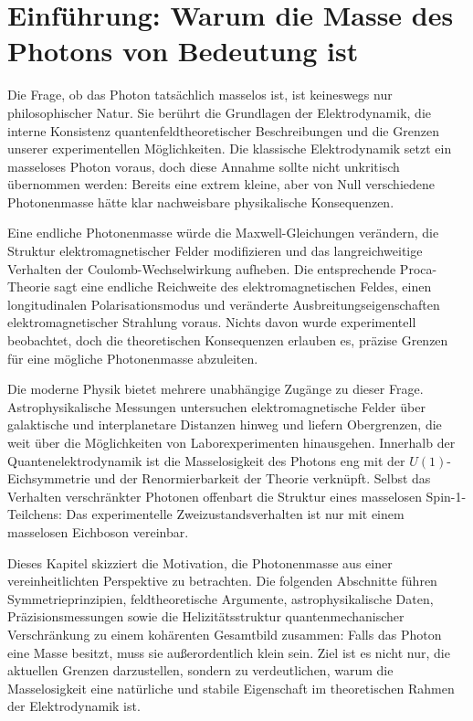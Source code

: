 \section{Einführung: Warum die Masse des Photons von Bedeutung ist}

Die Frage, ob das Photon tatsächlich masselos ist, ist keineswegs nur 
philosophischer Natur. Sie berührt die Grundlagen der Elektrodynamik, 
die interne Konsistenz quantenfeldtheoretischer Beschreibungen und die 
Grenzen unserer experimentellen Möglichkeiten. Die klassische 
Elektrodynamik setzt ein masseloses Photon voraus, doch diese Annahme 
sollte nicht unkritisch übernommen werden: Bereits eine extrem kleine, 
aber von Null verschiedene Photonenmasse hätte klar nachweisbare 
physikalische Konsequenzen.

Eine endliche Photonenmasse würde die Maxwell-Gleichungen verändern, die 
Struktur elektromagnetischer Felder modifizieren und das langreichweitige 
Verhalten der Coulomb-Wechselwirkung aufheben. Die entsprechende Proca-Theorie 
sagt eine endliche Reichweite des elektromagnetischen Feldes, einen 
longitudinalen Polarisationsmodus und veränderte Ausbreitungseigenschaften 
elektromagnetischer Strahlung voraus. Nichts davon wurde experimentell 
beobachtet, doch die theoretischen Konsequenzen erlauben es, präzise 
Grenzen für eine mögliche Photonenmasse abzuleiten.

Die moderne Physik bietet mehrere unabhängige Zugänge zu dieser Frage. 
Astrophysikalische Messungen untersuchen elektromagnetische Felder über 
galaktische und interplanetare Distanzen hinweg und liefern Obergrenzen, 
die weit über die Möglichkeiten von Laborexperimenten hinausgehen. 
Innerhalb der Quantenelektrodynamik ist die Masselosigkeit des Photons 
eng mit der $U(1)$-Eichsymmetrie und der Renormierbarkeit der Theorie 
verknüpft. Selbst das Verhalten verschränkter Photonen offenbart die 
Struktur eines masselosen Spin-1-Teilchens: Das experimentelle 
Zweizustandsverhalten ist nur mit einem masselosen Eichboson vereinbar.

Dieses Kapitel skizziert die Motivation, die Photonenmasse aus einer 
vereinheitlichten Perspektive zu betrachten. Die folgenden Abschnitte 
führen Symmetrieprinzipien, feldtheoretische Argumente, astrophysikalische 
Daten, Präzisionsmessungen sowie die Helizitätsstruktur quantenmechanischer 
Verschränkung zu einem kohärenten Gesamtbild zusammen: Falls das Photon 
eine Masse besitzt, muss sie außerordentlich klein sein. Ziel ist es nicht 
nur, die aktuellen Grenzen darzustellen, sondern zu verdeutlichen, warum 
die Masselosigkeit eine natürliche und stabile Eigenschaft im theoretischen 
Rahmen der Elektrodynamik ist.

